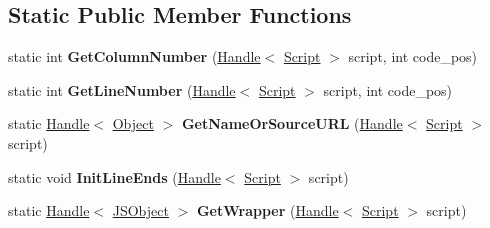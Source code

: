\subsection*{Static Public Member Functions}
\begin{DoxyCompactItemize}
\item 
\hypertarget{classv8_1_1internal_1_1_script_a55c19d42384732300d10e24e08111388}{}static int {\bfseries Get\+Column\+Number} (\hyperlink{classv8_1_1internal_1_1_handle}{Handle}$<$ \hyperlink{classv8_1_1internal_1_1_script}{Script} $>$ script, int code\+\_\+pos)\label{classv8_1_1internal_1_1_script_a55c19d42384732300d10e24e08111388}

\item 
\hypertarget{classv8_1_1internal_1_1_script_ac4c805194bb37998b48c165bae21d4ff}{}static int {\bfseries Get\+Line\+Number} (\hyperlink{classv8_1_1internal_1_1_handle}{Handle}$<$ \hyperlink{classv8_1_1internal_1_1_script}{Script} $>$ script, int code\+\_\+pos)\label{classv8_1_1internal_1_1_script_ac4c805194bb37998b48c165bae21d4ff}

\item 
\hypertarget{classv8_1_1internal_1_1_script_a396ee21c2637f6099a50d104adaa709d}{}static \hyperlink{classv8_1_1internal_1_1_handle}{Handle}$<$ \hyperlink{classv8_1_1internal_1_1_object}{Object} $>$ {\bfseries Get\+Name\+Or\+Source\+U\+R\+L} (\hyperlink{classv8_1_1internal_1_1_handle}{Handle}$<$ \hyperlink{classv8_1_1internal_1_1_script}{Script} $>$ script)\label{classv8_1_1internal_1_1_script_a396ee21c2637f6099a50d104adaa709d}

\item 
\hypertarget{classv8_1_1internal_1_1_script_ab34230113920d04f77c2a884c47a9506}{}static void {\bfseries Init\+Line\+Ends} (\hyperlink{classv8_1_1internal_1_1_handle}{Handle}$<$ \hyperlink{classv8_1_1internal_1_1_script}{Script} $>$ script)\label{classv8_1_1internal_1_1_script_ab34230113920d04f77c2a884c47a9506}

\item 
\hypertarget{classv8_1_1internal_1_1_script_abf57cb5e70fa77906c644efa9a3ea1d5}{}static \hyperlink{classv8_1_1internal_1_1_handle}{Handle}$<$ \hyperlink{classv8_1_1internal_1_1_j_s_object}{J\+S\+Object} $>$ {\bfseries Get\+Wrapper} (\hyperlink{classv8_1_1internal_1_1_handle}{Handle}$<$ \hyperlink{classv8_1_1internal_1_1_script}{Script} $>$ script)\label{classv8_1_1internal_1_1_script_abf57cb5e70fa77906c644efa9a3ea1d5}

\end{DoxyCompactItemize}
